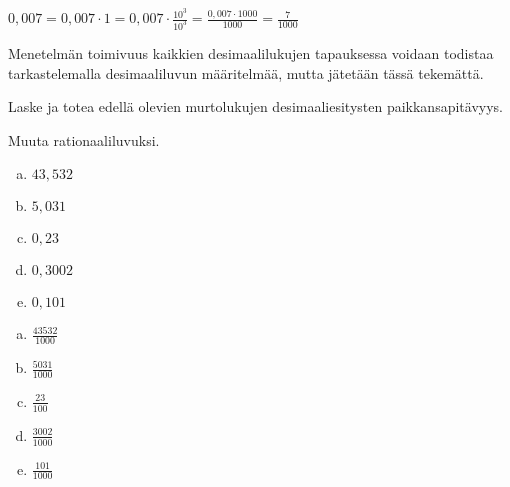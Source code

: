 \begin{esimerkki}
$0,007 = 0,007 \cdot 1 = 0,007 \cdot \frac{10^3}{10^3} = \frac{0,007 \cdot 1000}{1000} = \frac{7}{1000}$
\end{esimerkki}

Menetelmän toimivuus kaikkien desimaalilukujen tapauksessa voidaan todistaa tarkastelemalla desimaaliluvun määritelmää, mutta jätetään tässä tekemättä.


\begin{tehtava}
Laske ja totea edellä olevien murtolukujen desimaaliesitysten paikkansapitävyys.
\end{tehtava}

\begin{tehtava}
Muuta rationaaliluvuksi.
	\begin{enumerate}[a)]
		\item $43,532$
		\item $5,031$
		\item $0,23$
		\item $0,3002$
		\item $0,101$
	\end{enumerate}
\begin{vastaus}
	\begin{enumerate}[a)]
		\item $ \frac{43532}{1000}$
		\item $ \frac{5031}{1000}$
		\item $ \frac{23}{100}$
		\item $ \frac{3002}{1000}$
		\item $ \frac{101}{1000}$
	\end{enumerate}
\end{vastaus}
\end{tehtava}

